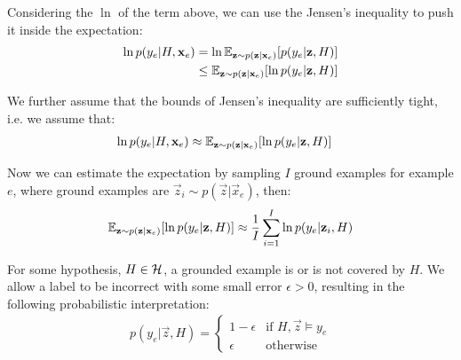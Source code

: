 Considering the $\ln$ of the term above, we can use the Jensen's inequality to push it inside the expectation:
\begin{align}
\ln p(y_e|H, \textbf{x}_e)
&= \ln \mathbb{E}_{\textbf{z} \sim p(\textbf{z}| \textbf{x}_e)}[p(y_e|\textbf{z},H)] \nonumber \\
&\leq \mathbb{E}_{\textbf{z} \sim p(\textbf{z}| \textbf{x}_e)}[\ln  p(y_e|\textbf{z},H)] 
\nonumber \\
\end{align}

We further assume that the bounds of Jensen's inequality are sufficiently tight, i.e. we assume that:
\begin{align}
\ln p(y_e|H, \textbf{x}_e)
&\approx \mathbb{E}_{\textbf{z} \sim p(\textbf{z}| \textbf{x}_e)}[\ln  p(y_e|\textbf{z},H)] \label{jensen-approx}
\end{align}

Now we can estimate the expectation by sampling $I$ ground examples for example $e$, where ground examples are $\vec{z}_{i} \sim p(\vec{z}| \vec{x}_e)$, then:
\begin{align}
\mathbb{E}_{\textbf{z} \sim p(\textbf{z}| \textbf{x}_e)}[\ln  p(y_e|\textbf{z},H)]
\approx \frac{1}{I} \sum_{i=1}^{I} \ln  p(y_e|\textbf{z}_i,H) \label{sampling-result}
\end{align}


For some hypothesis, $H\in \mathcal{H}$, a grounded example is or is not covered by $H$. We allow a label to be incorrect with some small error $\epsilon > 0$, resulting in the following probabilistic interpretation:
\begin{align}
p(y_e | \vec{z}, H) =
\begin{cases}
1 - \epsilon & \text{if } H, \vec{z} \models y_e \\
\epsilon & \text{otherwise}
\label{def-ground}
\end{cases}
\end{align}

